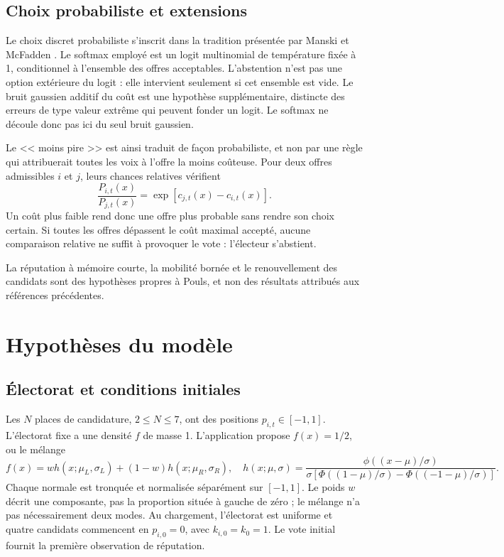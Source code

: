 \documentclass[11pt,a4paper]{article}
\begin{document}
\subsection{Choix probabiliste et extensions}
Le choix discret probabiliste s'inscrit dans la tradition présentée par
Manski et McFadden \cite{manski1981}. Le softmax employé est un logit
multinomial de température fixée à 1, conditionnel à l'ensemble des offres
acceptables. L'abstention n'est pas une option extérieure du logit :
elle intervient seulement si cet ensemble est vide.
Le bruit gaussien additif du coût est une hypothèse supplémentaire,
distincte des erreurs de type valeur extrême qui peuvent fonder un logit.
Le softmax ne découle donc pas ici du seul bruit gaussien.

Le << moins pire >> est ainsi traduit de façon probabiliste, et non
par une règle qui attribuerait toutes les voix à l'offre la moins
coûteuse. Pour deux offres admissibles $i$ et $j$, leurs chances
relatives vérifient
\[
\frac{P_{i,t}(x)}{P_{j,t}(x)}
=\exp\!\left[c_{j,t}(x)-c_{i,t}(x)\right].
\]
Un coût plus faible rend donc une offre plus probable sans rendre
son choix certain. Si toutes les offres dépassent le coût maximal
accepté, aucune comparaison relative ne suffit à provoquer le vote :
l'électeur s'abstient.

La réputation à mémoire courte, la mobilité bornée et le renouvellement
des candidats sont des hypothèses propres à Pouls, et non des résultats
attribués aux références précédentes.

\section{Hypothèses du modèle}

\subsection{Électorat et conditions initiales}
Les $N$ places de candidature, $2\leq N\leq7$, ont des positions
$p_{i,t}\in[-1,1]$. L'électorat fixe a une densité $f$ de masse 1.
L'application propose $f(x)=1/2$, ou le mélange
\[
f(x)=w h(x;\mu_L,\sigma_L)+(1-w)h(x;\mu_R,\sigma_R),
\quad
h(x;\mu,\sigma)=
\frac{\phi((x-\mu)/\sigma)}
{\sigma[\Phi((1-\mu)/\sigma)-\Phi((-1-\mu)/\sigma)]}.
\]
Chaque normale est tronquée et normalisée séparément sur $[-1,1]$.
Le poids $w$ décrit une composante, pas la proportion située à gauche
de zéro ; le mélange n'a pas nécessairement deux modes.
Au chargement, l'électorat est uniforme et quatre candidats commencent
en $p_{i,0}=0$, avec $k_{i,0}=k_0=1$.
Le vote initial fournit la première observation de réputation.
\end{document}
